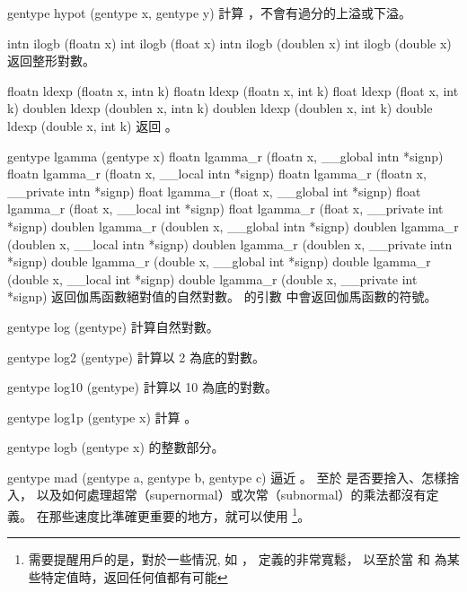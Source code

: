 gentype hypot (gentype x, gentype y)
\stopbuffer
{}
計算 ，不會有過分的上溢或下溢。
\stopbuffer

intn ilogb (floatn x)
int ilogb (float x)
intn ilogb (doublen x)
int ilogb (double x)
\stopbuffer
{}
返回整形對數。
\stopbuffer

floatn ldexp (floatn x, intn k)
floatn ldexp (floatn x, int k)
float ldexp (float x, int k)
doublen ldexp (doublen x, intn k)
doublen ldexp (doublen x, int k)
double ldexp (double x, int k)
\stopbuffer
{}
返回 。
\stopbuffer

gentype lgamma (gentype x)
floatn lgamma_r (floatn x,
	__global intn *signp)
floatn lgamma_r (floatn x,
	__local intn *signp)
floatn lgamma_r (floatn x,
	__private intn *signp)
float lgamma_r (float x,
	__global int *signp)
float lgamma_r (float x,
	__local int *signp)
float lgamma_r (float x,
	__private int *signp)
doublen lgamma_r (doublen x,
	__global intn *signp)
doublen lgamma_r (doublen x,
	__local intn *signp)
doublen lgamma_r (doublen x,
	__private intn *signp)
double lgamma_r (double x,
	__global int *signp)
double lgamma_r (double x,
	__local int *signp)
double lgamma_r (double x,
	__private int *signp)
\stopbuffer
{}
返回伽馬函數絕對值的自然對數。
 的引數  中會返回伽馬函數的符號。
\stopbuffer

gentype log (gentype)
\stopbuffer
{}
計算自然對數。
\stopbuffer

gentype log2 (gentype)
\stopbuffer
{}
計算以 2 為底的對數。
\stopbuffer

gentype log10 (gentype)
\stopbuffer
{}
計算以 10 為底的對數。
\stopbuffer

gentype log1p (gentype x)
\stopbuffer
{}
計算 。
\stopbuffer

gentype logb (gentype x)
\stopbuffer
{}
的整數部分。
\stopbuffer

gentype mad (gentype a,
	gentype b,
	gentype c)
\stopbuffer
{}
 逼近 。
至於  是否要捨入、怎樣捨入，
以及如何處理超常（supernormal）或次常（subnormal）的乘法都沒有定義。
在那些速度比準確更重要的地方，就可以使用 \footnote{
需要提醒用戶的是，對於一些情況,
如 ，  定義的非常寬鬆，
以至於當  和  為某些特定值時，返回任何值都有可能}。
\stopbuffer

